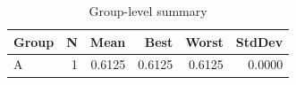 \begin{table}[htbp]
\centering
\caption{Group-level summary}
\label{tab:group-summary}
\begin{tabular}{lrrrrr}
\toprule
\textbf{Group} & \textbf{N} & \textbf{Mean} & \textbf{Best} & \textbf{Worst} & \textbf{StdDev} \\
\midrule
A & 1 & 0.6125 & 0.6125 & 0.6125 & 0.0000 \\
\bottomrule
\end{tabular}
\end{table}